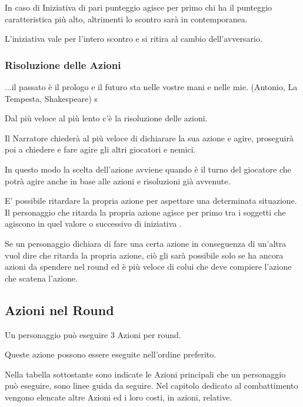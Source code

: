 \documentclass[a4paper,11pt,twoside,openany]{book}
\begin{document}
In caso di Iniziativa di pari punteggio agisce per primo chi ha il punteggio caratteristica più alto, altrimenti lo scontro sarà in contemporanea.

L'iniziativa vale per l'intero scontro e si ritira al cambio dell'avversario.

\subsubsection{Risoluzione delle Azioni}

\begin{tcolorbox}[enhanced,arc=5pt,boxrule=0.3pt]{
...il passato è il prologo e il futuro sta nelle vostre mani e nelle mie. (Antonio, La Tempesta, Shakespeare)}
s\end{tcolorbox}\medskip


\label{risoluzione-delle-azioni}

Dal più veloce al più lento c'è la risoluzione delle azioni.

Il Narratore chiederà al più veloce di dichiarare la sua azione e agire, proseguirà poi a chiedere e fare agire gli altri giocatori e nemici.

In questo modo la scelta dell'azione avviene quando è il turno del giocatore che potrà agire anche in base alle azioni e risoluzioni già avvenute.

E' possibile ritardare la propria azione per aspettare una determinata situazione. Il personaggio che ritarda la propria azione agisce per primo tra i soggetti che agiscono in quel valore o successivo di iniziativa .

Se un personaggio dichiara di fare una certa azione in conseguenza di un'altra vuol dire che ritarda la propria azione, ciò gli sarà possibile solo se ha ancora azioni da spendere nel round ed è più veloce di colui che deve compiere l'azione che scatena l'azione.

\subsection{Azioni nel Round}

\label{azioni-nel-round}

Un personaggio può eseguire 3 Azioni per round.

Queste azione possono essere eseguite nell'ordine preferito.

Nella tabella sottostante sono indicate le Azioni principali che un personaggio può eseguire, sono linee guida da seguire. Nel capitolo dedicato al combattimento vengono elencate altre Azioni ed i loro costi, in azioni, relative.
\end{document}
